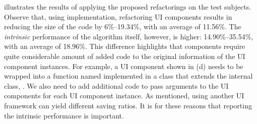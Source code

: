  illustrates the results of applying the proposed refactorings
on the test subjects.
Observe that, using \react implementation,
refactoring UI components results in reducing the size of the \html code
by 6\%--19.34\%, with an average of 11.56\%.
The \textit{intrinsic} performance of the algorithm itself, however, is higher: 14.90\%--35.54\%,
with an average of 18.96\%.
This difference highlights that \react components require quite considerable amount of added code
to the original \dom information of the UI component instances.
For example, a UI component shown in (d)
needs to be wrapped into a function named  implemented in a
\javascript class that extends the internal \react class, .
We also need to add additional code to pass arguments to the UI components for each UI component instance.
As mentioned, using another UI framework can yield different saving ratios. It is for these reasons that reporting the intrinsic performance is important.

